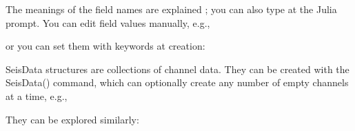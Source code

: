 \documentclass[letterpaper,11pt,english]{sphinxmanual}
\begin{document}
\begin{fulllineitems}
\end{fulllineitems}


The meanings of the field names are explained {\hyperref[\detokenize{src/Appendices/keywords:dkw}]{}}; you can also type
 at the Julia prompt. You can edit field values manually, e.g.,

%
\begin{sphinxVerbatim}[commandchars=\\\{\}]
  \PYG{p}{[}    \PYG{p}{]}
  
\end{sphinxVerbatim}

or you can set them with keywords at creation:

%
\begin{sphinxVerbatim}[commandchars=\\\{\}]
  
\end{sphinxVerbatim}

SeisData structures are collections of channel data. They can be created with
the SeisData() command, which can optionally create any number of empty channels
at a time, e.g.,


\begin{fulllineitems}
\end{fulllineitems}


They can be explored similarly:

%
\begin{sphinxVerbatim}[commandchars=\\\{\}]
\PYG{p}{[}\PYG{p}{]}  
\PYG{p}{[}\PYG{p}{]}  \PYG{p}{[}    \PYG{p}{]}
\end{sphinxVerbatim}
\end{document}
